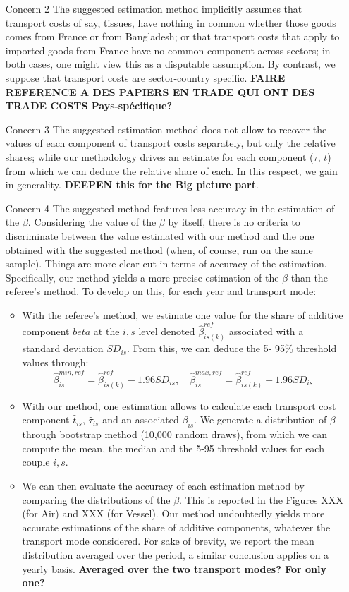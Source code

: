 \documentclass[a4paper,12pt]{article}
\begin{document}
\begin{itemize}
\begin{enumerate}
    \end{enumerate}
\item[Concern 2] The suggested estimation method implicitly assumes that transport costs of say, tissues, have nothing in common whether those goods comes from France or from Bangladesh; or that transport costs that apply to imported goods from France have no common component across sectors; in both cases, one might view this as a disputable assumption. By contrast, we suppose that transport costs are sector-country specific. \textbf{FAIRE REFERENCE A DES PAPIERS EN TRADE QUI ONT DES TRADE COSTS Pays-spécifique?}
\item[Concern 3] The suggested estimation method does not allow to recover the values of each component of transport costs separately, but only the relative shares; while our methodology drives an estimate for each component ($\tau$, $t$) from which we can deduce the relative share of each. In this respect, we gain in generality. \textbf{DEEPEN this for the Big picture part}.
\item[Concern 4] The suggested method features less accuracy in the estimation of the $\beta$. Considering the value of the $\beta$ by itself, there is no criteria to discriminate between the value estimated with our method and the one obtained with the suggested method (when, of course, run on the same sample). Things are more clear-cut in terms of accuracy of the estimation. Specifically, our method yields a more precise estimation of the $\beta$ than the referee's method. To develop on this, for each year and transport mode:
    \begin{itemize}
    \item With the referee's method, we estimate one value for the share of additive component $beta$ at the $i,s$ level denoted $\hat{\beta}^{ref}_{is(k)}$ associated with a standard deviation $SD_{is}$. From this, we can deduce the 5- 95\% threshold values through:
        $$\hat{\beta}_{is}^{min,ref} = \hat{\beta}^{ref}_{is(k)} - 1.96 SD_{is},\quad \hat{\beta}_{is}^{max,ref} = \hat{\beta}^{ref}_{is(k)} + 1.96 SD_{is}$$
     
    \item  With our method, one estimation allows to calculate each transport cost component $\hat{t}_{is}$, $\hat{\tau}_{is}$ and an associated $\beta_{is}$. We generate a distribution of $\beta$ through bootstrap method (10,000 random draws), from which we can compute the mean, the median and the 5-95 threshold values for each couple $i,s$.
    \item We can then evaluate the accuracy of each estimation method by comparing the distributions of the $\beta$. This is reported in the Figures XXX (for Air) and XXX (for Vessel). Our method undoubtedly yields more accurate estimations of the share of additive components, whatever the transport mode considered. For sake of brevity, we report the mean distribution averaged over the period, a similar conclusion applies on a yearly basis. \textbf{Averaged over the two transport modes? For only one?}
        


\end{itemize}
\end{itemize}
\end{document}
